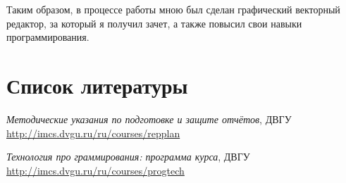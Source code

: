 \documentclass[a4paper,12pt]{article}
\begin{document}
Таким образом, в процессе работы мною был сделан графический векторный редактор, за который я получил зачет, а также повысил свои навыки программирования.


\section{Список литературы}

\begin{thebibliography}{10}

 \emph{Методические указания по подготовке и защите отчётов}, ДВГУ\\ \url{http://imcs.dvgu.ru/ru/courses/repplan}

 \emph{Технология про граммирования: программа курса}, ДВГУ\\
\url{http://imcs.dvgu.ru/ru/courses/progtech}
\end{thebibliography}
\end{document}
